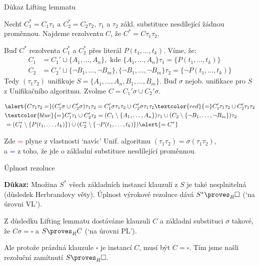 \documentclass{beamer}
\begin{document}
\begin{frame}{Důkaz Lifting lemmatu}

    \pause
    Nechť \alert{$C^*_1=C_1\tau_1$} a \alert{$C^*_2=C_2\tau_2$}, $\tau_1$ a $\tau_2$ zákl. substituce nesdílející žádnou proměnnou. Najdeme rezolventu $C$, že \alert{$C^*=C\tau_1\tau_2$}.

    \pause
    Buď $C^*$ rezolventa $C_1^*$ a $C_2^*$ přes literál $P(t_1,\dots,t_k)$. Víme, že:\pause
    \begin{align*}
        C_1&=C_1' \sqcup \{A_1,\dots,A_n\},\text{ kde }\{A_1,\dots,A_n\}\tau_1=\{P(t_1,\dots,t_k)\}\\
        C_2&=C_2' \sqcup \{\neg B_1,\dots,\neg B_m\},\{\neg B_1,\dots,\neg B_m\}\tau_2=\{\neg P(t_1,\dots,t_k)\}
    \end{align*}
    \pause Tedy $(\tau_1\tau_2)$ unifikuje $S=\{A_1,\dots,A_n,B_1,\dots,B_m\}$. Buď $\sigma$ nejob. unifikace pro $S$ z Unifikačního algoritmu. Zvolme \alert{$C=C_1'\sigma \cup C_2'\sigma$}.

    \vspace{-24pt}
    
    \pause
    \begin{align*}
        &\alert{C\tau_1\tau_2
        =} (C_1'\sigma \cup C_2'\sigma)\tau_1\tau_2
        =C_1'\sigma\tau_1\tau_2 \cup C_2'\sigma\tau_1\tau_2
        \textcolor{red}{=}C_1'\tau_1\tau_2 \cup C_2'\tau_1\tau_2\\ &
        \textcolor{blue}{=}C_1'\tau_1 \cup C_2'\tau_2
        =(C_1\setminus\{A_1,\dots,A_n\})\tau_1\cup (C_2\setminus\{\neg B_1,\dots,\neg B_m\})\tau_2\\
        &=(C_1^*\setminus\{P(t_1,\dots,t_k)\})\cup(C_2^*\setminus \{\neg P(t_1,\dots,t_k)\})\alert{=C^*}
    \end{align*}
    
    \pause
    Zde \textcolor{red}{=} plyne z vlastnosti `navíc' Unif. algoritmu $(\tau_1\tau_2)=\sigma(\tau_1\tau_2)$, \\a \textcolor{blue}{=} z 
    toho, že jde o základní substituce nesdílející proměnnou.\hfill\qedsymbol    

\end{frame}


\begin{frame}{Úplnost rezoluce}

    \pause

    \medskip

    \pause
    \textbf{Důkaz:} \pause
    Množina $S^*$ všech základních instancí klauzulí z $S$ je také nesplnitelná (důsledek Herbrandovy věty). \pause Úplnost \alert{výrokové} rezoluce dává $S^*\proves_R\square$ (`na úrovni VL').\pause 
    
    Z důsledku Lifting lemmatu dostáváme klauzuli $C$ a základní substituci $\sigma$ takové, že $C\sigma=\square$ a $S\proves_R C$ (`na úrovni PL'). \pause
    
    Ale protože prázdná klauzule $\square$ je instancí $C$, musí být $C=\square$. Tím jsme našli rezoluční zamítnutí $S\proves_R \square$.        
    \hfill\qedsymbol

\end{frame}
\end{document}

